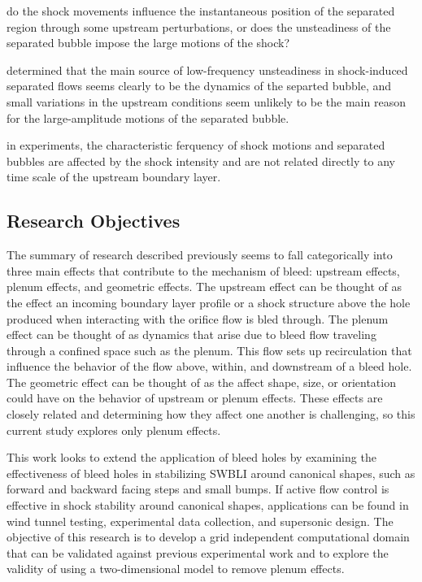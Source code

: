 do the shock
movements influence the instantaneous position of the separated region through some
upstream perturbations, or does the unsteadiness of the separated bubble impose the
large motions of the shock?

determined that the main source of low-frequency unsteadiness in shock-induced separated flows seems clearly to be the dynamics of the separted bubble, and small variations in the upstream conditions seem unlikely to be the main reason for the large-amplitude motions of the separated bubble. 

in experiments, the characteristic ferquency of shock motions and separated bubbles are affected by the shock intensity and are not related directly to any time scale of the upstream boundary layer.








\subsection{Research Objectives}


The summary of research described previously seems to fall categorically into three main effects that contribute to the mechanism of bleed: upstream effects, plenum effects, and geometric effects. 
The upstream effect can be thought of as the effect an incoming boundary layer profile or a shock structure above the hole produced when interacting with the orifice flow is bled through. 
The plenum effect can be thought of as dynamics that arise due to bleed flow traveling through a confined space such as the plenum. This flow sets up recirculation that influence the behavior of the flow above, within, and downstream of a bleed hole.
The geometric effect can be thought of as the affect shape, size, or orientation could have on the behavior of upstream or plenum effects. %
These effects are closely related and determining how they affect one another is challenging, so this current study explores only plenum effects. 


This work looks to extend the application of bleed holes by examining the effectiveness of bleed holes in stabilizing SWBLI around canonical shapes, such as forward and backward facing steps and small bumps. If active flow control is effective in shock stability around canonical shapes, applications can be found in wind tunnel testing, experimental data collection, and supersonic design. 
The objective of this research is to develop a grid independent computational domain that can be validated against previous experimental work and to explore the validity of using a two-dimensional model to remove plenum effects. %




